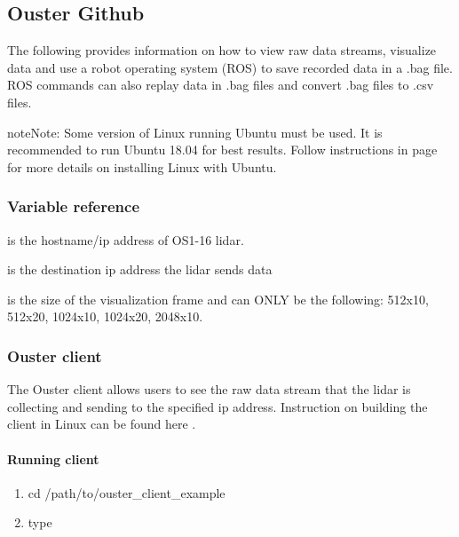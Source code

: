 \documentclass[letterpaper,10pt,english]{sphinxmanual}
\begin{document}
\subsection{Ouster Github}
\label{\detokenize{Ouster lidar:ouster-github}}
The following  provides information on how to view raw data streams, visualize data and use a robot operating system (ROS) to save recorded data in a .bag file.
ROS commands can also replay data in .bag files and convert .bag files to .csv files.

\begin{sphinxadmonition}{note}{Note:}
Some version of Linux running Ubuntu must be used. It is recommended to run Ubuntu 18.04 for best results. Follow instructions in  page for more details on installing Linux with Ubuntu.
\end{sphinxadmonition}


\subsubsection{Variable reference}
\label{\detokenize{Ouster lidar:variable-reference}}
 is the hostname/ip address of OS1-16 lidar.

 is the destination ip address the lidar sends data

 is the size of the visualization frame and can ONLY be the following: 512x10, 512x20, 1024x10, 1024x20, 2048x10.


\subsubsection{Ouster client}
\label{\detokenize{Ouster lidar:ouster-client}}
The Ouster client allows users to see the raw data stream that the lidar is collecting and sending to the specified ip address.
Instruction on building the client in Linux can be found here .


\paragraph{Running client}
\label{\detokenize{Ouster lidar:running-client}}\begin{enumerate}
\def\theenumi{\arabic{enumi}}
\def\labelenumi{\theenumi .}
\makeatletter\def\p@enumii{\p@enumi \theenumi .}\makeatother
\item {} 
cd /path/to/ouster\_client\_example

\item {} 
type 

\end{enumerate}
\end{document}
